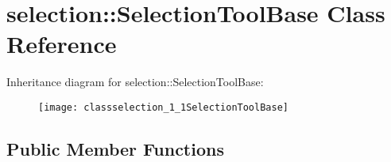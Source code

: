 \hypertarget{classselection_1_1SelectionToolBase}{\section{selection\-:\-:Selection\-Tool\-Base Class Reference}
\label{classselection_1_1SelectionToolBase}
}
Inheritance diagram for selection\-:\-:Selection\-Tool\-Base\-:\begin{figure}[H]
\begin{center}
\leavevmode
\texttt{[image: classselection\_1\_1SelectionToolBase]}
\end{center}
\end{figure}
\subsection*{Public Member Functions}
